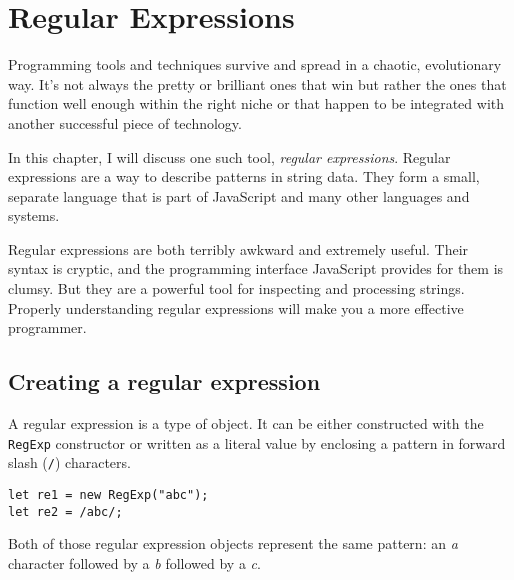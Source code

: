 \chapter{Regular Expressions}\label{regexp}


Programming tools and techniques survive and spread in a chaotic, evolutionary way. It's not always the pretty or brilliant ones that win but rather the ones that function well enough within the right niche or that happen to be integrated with another successful piece of technology.

In this chapter, I will discuss one such tool, \emph{regular
expressions}. Regular expressions are a way to describe patterns in string data. They form a small, separate language that is part of JavaScript and many other languages and systems.

Regular expressions are both terribly awkward and extremely useful. Their syntax is cryptic, and the programming interface JavaScript provides for them is clumsy. But they are a powerful tool for inspecting and processing strings. Properly understanding regular expressions will make you a more effective programmer.

\section{Creating a regular expression}

A regular expression is a type of object. It can be either constructed with the \lstinline`RegExp` constructor or written as a literal value by enclosing a pattern in forward slash (\lstinline`/`) characters.

\begin{lstlisting}
let re1 = new RegExp("abc");
let re2 = /abc/;
\end{lstlisting}
\noindent

Both of those regular expression objects represent the same pattern: an \emph{a} character followed by a \emph{b} followed by a \emph{c}.

